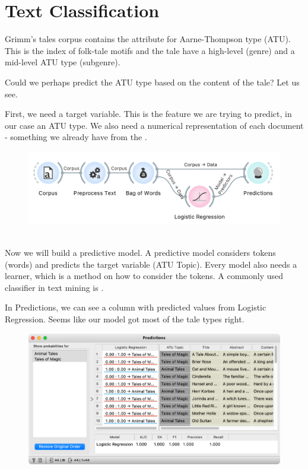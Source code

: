 \chapter{Text Classification}

Grimm's tales corpus contains the attribute for Aarne-Thompson type (ATU). This is the index of folk-tale motifs and the tale have a high-level (genre) and a mid-level ATU type (subgenre).

Could we perhaps predict the ATU type based on the content of the tale? Let us see.

First, we need a target variable. This is the feature we are trying to predict, in our case an ATU type. We also need a numerical representation of each document - something we already have from the .

\vspace{-0.2cm}
\begin{figure}[h]
  \centering
  \includegraphics[width=0.8\linewidth]{workflow.png}%
  \caption{$\;$}
\end{figure}
\vspace{-0.3cm}

Now we will build a predictive model. A predictive model considers tokens (words) and predicts the target variable (ATU Topic). Every model also needs a learner, which is a method on how to consider the tokens. A commonly used classifier in text mining is .

In Predictions, we can see a column with predicted values from Logistic Regression. Seems like our model got most of the tale types right.

\vspace{-0.2cm}
\begin{figure}[h]
  \centering
  \includegraphics[width=0.9\linewidth]{predictions.png}%
  \caption{$\;$}
\end{figure}
\vspace{-0.3cm}
